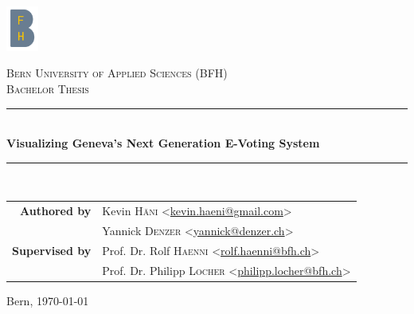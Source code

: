 \begin{titlepage}
\begin{center}
	\includegraphics[width=0.08\textwidth]{assets/bfh_logo.png}

	\vspace{1cm}

	\textsc{\Large Bern University of Applied Sciences (BFH)} \\[1.5cm]
	\textsc{\Large Bachelor Thesis} \\[1cm]

	\newcommand{\HRule}{\rule{\linewidth}{0.3mm}}
	\HRule \\[0.4cm]
	{\Large \bfseries Visualizing Geneva's Next Generation E-Voting System} \\
	\HRule \\[1.5cm]

	\begin{tabular}{rl}
	\textbf{Authored by}
	& Kevin \textsc{Häni} <\href{mailto:kevin.haeni@gmail.com}{kevin.haeni@gmail.com}> \\
	& Yannick \textsc{Denzer} <\href{mailto:yannick@denzer.ch}{yannick@denzer.ch}> \\
	\textbf{Supervised by}
	& Prof. Dr. Rolf \textsc{Haenni} <\href{mailto:rolf.haenni@bfh.ch}{rolf.haenni@bfh.ch}> \\
	& Prof. Dr. Philipp \textsc{Locher} <\href{mailto:philipp.locher@bfh.ch}{philipp.locher@bfh.ch}> \\
	\end{tabular}

	\vfill

	Bern, {\large \today}
\end{center}
\end{titlepage}
